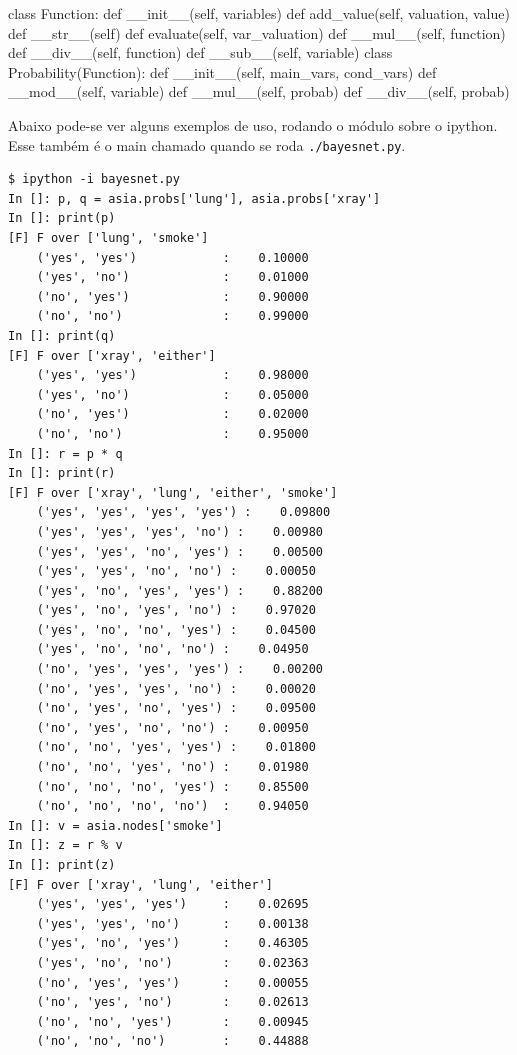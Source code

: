 \documentclass[paper=a4, fontsize=11pt]{scrartcl} %
\numberwithin{equation}{subsection}
\numberwithin{figure}{subsection}
\numberwithin{table}{subsection}
\numberwithin{definition}{subsection}
\numberwithin{theorem}{subsection}
\numberwithin{property}{subsection}
\numberwithin{proposition}{subsection}
\numberwithin{equation}{section}
\numberwithin{figure}{section}
\numberwithin{table}{section}
\numberwithin{definition}{section}
\numberwithin{theorem}{section}
\numberwithin{property}{section}
\numberwithin{proposition}{section}
\begin{document}
\begin{python}
class Function:
    def __init__(self, variables)
    def add_value(self, valuation, value)
    def __str__(self)
    def evaluate(self, var_valuation)
    def __mul__(self, function)
    def __div__(self, function)
    def __sub__(self, variable)
class Probability(Function):
    def __init__(self, main_vars, cond_vars)
    def __mod__(self, variable)
    def __mul__(self, probab)
    def __div__(self, probab)
\end{python}

Abaixo pode-se ver alguns exemplos de uso, rodando o módulo sobre o ipython. Esse também é o main chamado quando se roda \verb|./bayesnet.py|.

\begin{verbatim}
$ ipython -i bayesnet.py
In []: p, q = asia.probs['lung'], asia.probs['xray']
In []: print(p)
[F] F over ['lung', 'smoke']
    ('yes', 'yes')            :    0.10000
    ('yes', 'no')             :    0.01000
    ('no', 'yes')             :    0.90000
    ('no', 'no')              :    0.99000 
In []: print(q)
[F] F over ['xray', 'either']
    ('yes', 'yes')            :    0.98000
    ('yes', 'no')             :    0.05000
    ('no', 'yes')             :    0.02000
    ('no', 'no')              :    0.95000
In []: r = p * q
In []: print(r)
[F] F over ['xray', 'lung', 'either', 'smoke']
    ('yes', 'yes', 'yes', 'yes') :    0.09800
    ('yes', 'yes', 'yes', 'no') :    0.00980
    ('yes', 'yes', 'no', 'yes') :    0.00500
    ('yes', 'yes', 'no', 'no') :    0.00050
    ('yes', 'no', 'yes', 'yes') :    0.88200
    ('yes', 'no', 'yes', 'no') :    0.97020
    ('yes', 'no', 'no', 'yes') :    0.04500
    ('yes', 'no', 'no', 'no') :    0.04950
    ('no', 'yes', 'yes', 'yes') :    0.00200
    ('no', 'yes', 'yes', 'no') :    0.00020
    ('no', 'yes', 'no', 'yes') :    0.09500
    ('no', 'yes', 'no', 'no') :    0.00950
    ('no', 'no', 'yes', 'yes') :    0.01800
    ('no', 'no', 'yes', 'no') :    0.01980
    ('no', 'no', 'no', 'yes') :    0.85500
    ('no', 'no', 'no', 'no')  :    0.94050
In []: v = asia.nodes['smoke']
In []: z = r % v
In []: print(z)
[F] F over ['xray', 'lung', 'either']
    ('yes', 'yes', 'yes')     :    0.02695
    ('yes', 'yes', 'no')      :    0.00138
    ('yes', 'no', 'yes')      :    0.46305
    ('yes', 'no', 'no')       :    0.02363
    ('no', 'yes', 'yes')      :    0.00055
    ('no', 'yes', 'no')       :    0.02613
    ('no', 'no', 'yes')       :    0.00945
    ('no', 'no', 'no')        :    0.44888
\end{verbatim}
\end{document}
